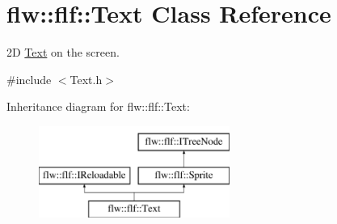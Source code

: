 \hypertarget{classflw_1_1flf_1_1Text}{}\section{flw\+:\+:flf\+:\+:Text Class Reference}
\label{classflw_1_1flf_1_1Text}


2D \hyperlink{classflw_1_1flf_1_1Text}{Text} on the screen.  




{\ttfamily \#include $<$Text.\+h$>$}

Inheritance diagram for flw\+:\+:flf\+:\+:Text\+:\begin{figure}[H]
\begin{center}
\leavevmode
\includegraphics[height=3.000000cm]{classflw_1_1flf_1_1Text}
\end{center}
\end{figure}
